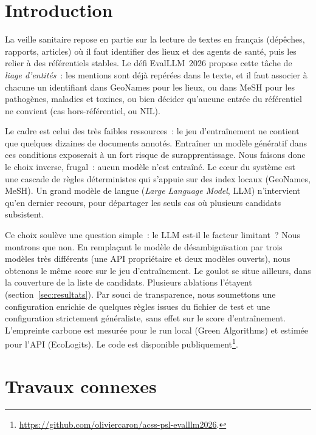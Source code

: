 \documentclass[10pt,twoside]{article}
\begin{document}
\section{Introduction}
\label{sec:intro}

La veille sanitaire repose en partie sur la lecture de textes en français (dépêches, rapports,
articles) où il faut identifier des lieux et des agents de santé, puis les relier à des
référentiels stables. Le défi EvalLLM~2026 propose cette tâche de \emph{liage d'entités}~:
les mentions sont déjà repérées dans le texte, et il faut associer à chacune un identifiant
dans GeoNames pour les lieux, ou dans MeSH pour les pathogènes, maladies et toxines, ou bien
décider qu'aucune entrée du référentiel ne convient (cas hors-référentiel, ou NIL).

Le cadre est celui des très faibles ressources~: le jeu d'entraînement ne contient que
quelques dizaines de documents annotés. Entraîner un modèle génératif dans ces conditions
exposerait à un fort risque de surapprentissage. Nous faisons donc le choix inverse, frugal~:
aucun modèle n'est entraîné. Le cœur du système est une cascade de règles
déterministes qui s'appuie sur des index locaux (GeoNames, MeSH). Un grand modèle de
langue (\emph{Large Language Model}, LLM) n'intervient qu'en dernier recours, pour départager les seuls cas où plusieurs
candidats subsistent.

Ce choix soulève une question simple~: le LLM est-il le facteur limitant~? Nous montrons que non.
En remplaçant le modèle de désambiguïsation par trois modèles très différents (une API
propriétaire et deux modèles ouverts), nous obtenons le même score sur le jeu d'entraînement. Le
goulot se situe ailleurs, dans la couverture de la liste de candidats. Plusieurs ablations
l'étayent (section~\ref{sec:resultats}). Par souci de transparence, nous soumettons une
configuration enrichie de quelques règles issues du fichier de test et une configuration
strictement généraliste, sans effet sur le score d'entraînement. L'empreinte carbone est mesurée
pour le run local (Green Algorithms) et estimée pour l'API (EcoLogits). Le code est disponible
publiquement\footnote{\url{https://github.com/oliviercaron/acss-psl-evalllm2026}.}.

\section{Travaux connexes}
\label{sec:related}
\end{document}
